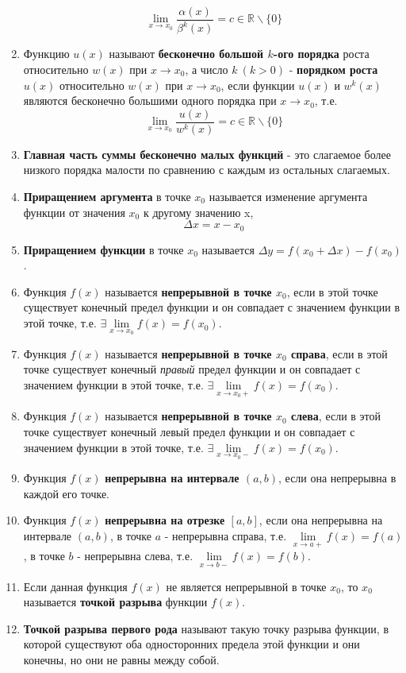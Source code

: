 \begin{enumerate}
$$\lim\limits_{x \to x_0} {\frac{\alpha(x)}{\beta^k(x)}} = c \in \mathbb{R} \backslash \{0\}$$
\item Функцию $u(x)$ называют \textbf{бесконечно большой $k$-ого порядка} роста относительно $w(x)$ при $x \rightarrow x_0$, а число $k \ (k > 0)$ - \textbf{порядком роста} $u(x)$ относительно $w(x)$ при $x \rightarrow x_0$, если функции $u(x)$ и $w^k(x)$ являются бесконечно большими одного порядка при $x \rightarrow x_0$, т.е. $$\lim\limits_{x \to x_0} {\frac{u(x)}{w^k(x)}} = c \in \mathbb{R} \backslash \{0\}$$
\item \textbf{Главная часть суммы бесконечно малых функций} - это слагаемое более низкого порядка малости по сравнению с каждым из остальных слагаемых.
\item \textbf{Приращением аргумента} в точке $x_0$ называется изменение аргумента функции от значения $x_0$ к другому значению x, $$\Delta x = x - x_0$$
\item \textbf{Приращением функции} в точке $x_0$ называется $\Delta y = f(x_0 + \Delta x) - f(x_0)$.
\item Функция $f(x)$ называется \textbf{непрерывной в точке $x_0$}, если в этой точке существует конечный предел функции и он совпадает с значением функции в этой точке, т.е. $\exists \lim\limits_{x \to x_0}f(x) = f(x_0)$.
\item Функция $f(x)$ называется \textbf{непрерывной в точке $x_0$ справа}, если в этой точке существует конечный \textit{правый} предел функции и он совпадает с значением функции в этой точке, т.е. $\exists \lim\limits_{x \to x_0+}f(x) = f(x_0)$.
\item Функция $f(x)$ называется \textbf{непрерывной в точке $x_0$ слева}, если в этой точке существует конечный левый предел функции и он совпадает с значением функции в этой точке, т.е. $\exists \lim\limits_{x \to x_0-}f(x) = f(x_0)$.
\item Функция $f(x)$ \textbf{непрерывна на интервале $(a, b)$}, если она непрерывна в каждой его точке.
\item Функция $f(x)$ \textbf{непрерывна на отрезке $[a, b]$}, если она непрерывна на интервале $(a, b)$, в точке $a$ - непрерывна справа, т.е. $\lim\limits_{x \to a+}f(x) = f(a)$, в точке $b$ - непрерывна слева, т.е. $\lim\limits_{x \to b-}f(x) = f(b)$.
\item Если данная функция $f(x)$ не является непрерывной в точке $x_0$, то $x_0$ называется \textbf{точкой разрыва} функции $f(x)$.
\item \textbf{Точкой разрыва первого рода} называют такую точку разрыва функции, в которой существуют оба односторонних предела этой функции и они конечны, но они не равны между собой.

\end{enumerate}
